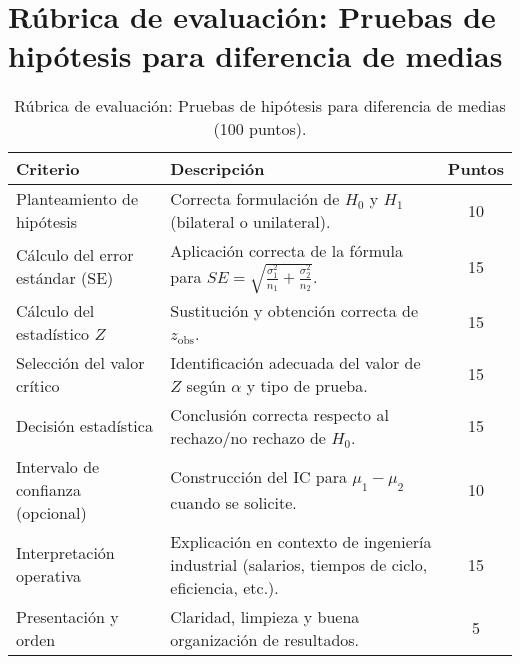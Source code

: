 

\section*{Rúbrica de evaluación: Pruebas de hipótesis para diferencia de medias}

\begin{table}[H]
\centering
\begin{tabular}{p{} p{} c}
\toprule
\textbf{Criterio} & \textbf{Descripción} & \textbf{Puntos}\\
\midrule
Planteamiento de hipótesis & Correcta formulación de $H_0$ y $H_1$ (bilateral o unilateral). & 10\\
Cálculo del error estándar (SE) & Aplicación correcta de la fórmula para $SE=\sqrt{\tfrac{\sigma_1^2}{n_1}+\tfrac{\sigma_2^2}{n_2}}$. & 15\\
Cálculo del estadístico $Z$ & Sustitución y obtención correcta de $z_{\text{obs}}$. & 15\\
Selección del valor crítico & Identificación adecuada del valor de $Z$ según $\alpha$ y tipo de prueba. & 15\\
Decisión estadística & Conclusión correcta respecto al rechazo/no rechazo de $H_0$. & 15\\
Intervalo de confianza (opcional) & Construcción del IC para $\mu_1-\mu_2$ cuando se solicite. & 10\\
Interpretación operativa & Explicación en contexto de ingeniería industrial (salarios, tiempos de ciclo, eficiencia, etc.). & 15\\
Presentación y orden & Claridad, limpieza y buena organización de resultados. & 5\\
\bottomrule
\end{tabular}
\caption{Rúbrica de evaluación: Pruebas de hipótesis para diferencia de medias (100 puntos).}
\end{table}